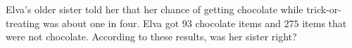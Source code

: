Elva's older sister told her that her chance of getting chocolate while trick-or-treating was about one in four. Elva got $93$ chocolate items and $275$ items that were not chocolate. According to these results, was her sister right?
